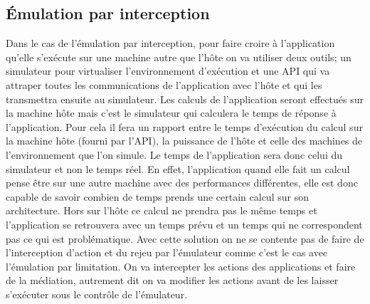 \subsection{Émulation par interception}

Dans le cas de l'émulation par interception, pour faire croire à l'application
qu'elle s'exécute sur une machine autre que l'hôte on va utiliser deux outils;
un simulateur pour virtualiser l'environnement d'exécution et une API qui va
attraper toutes les communications de l'application avec l'hôte et qui les
transmettra ensuite au simulateur. Les calculs de l'application seront
effectués sur la machine hôte mais c'est le simulateur qui calculera le temps de
réponse à l'application. Pour cela il fera un rapport entre le temps d'exécution
du calcul sur la machine hôte (fourni par l'API), la puissance de l'hôte et
celle des machines de l'environnement que l'on simule. Le temps de l'application
sera donc celui du simulateur et non le temps réel. En effet, l'application
quand elle fait un calcul pense être sur une autre machine avec des performances
différentes, elle est donc capable de savoir combien de temps prends une certain
calcul sur son architecture. Hors sur l'hôte ce calcul ne prendra pas le même
temps et l'application se retrouvera avec un temps prévu et un temps qui ne
correspondent pas ce qui est problématique.  Avec cette solution on ne se
contente pas de faire de l'interception d'action et du rejeu par l'émulateur
comme c'est le cas avec l'émulation par limitation. On va intercepter les
actions des applications et faire de la médiation, autrement dit on va modifier
les actions avant de les laisser s'exécuter sous le contrôle de l'émulateur.

